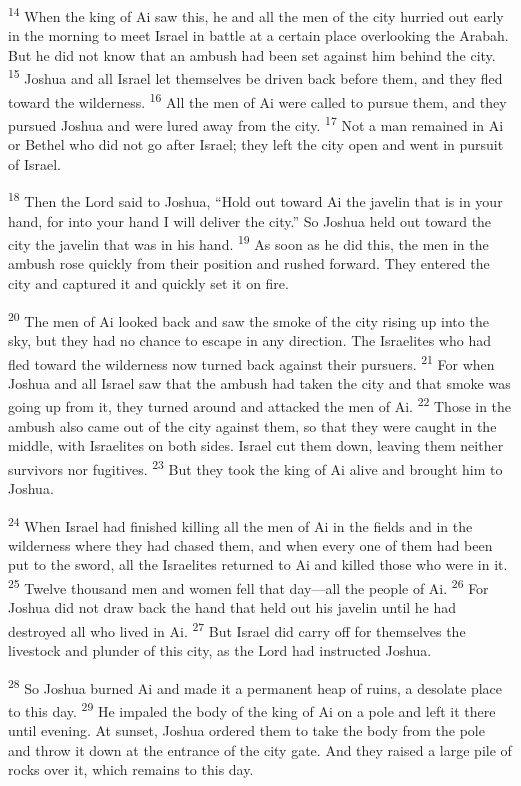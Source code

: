 \documentclass[12pt,twoside]{article}
\newcommand{\vs}[1]{\textsuperscript{#1}}
\begin{document}
\vs{14} When the king of Ai saw this, he and all the men of the city hurried out early in the morning to meet Israel in battle at a certain place overlooking the Arabah. But he did not know that an ambush had been set against him behind the city.
\vs{15} Joshua and all Israel let themselves be driven back before them, and they fled toward the wilderness.
\vs{16} All the men of Ai were called to pursue them, and they pursued Joshua and were lured away from the city.
\vs{17} Not a man remained in Ai or Bethel who did not go after Israel; they left the city open and went in pursuit of Israel.

\vs{18} Then the Lord said to Joshua, ``Hold out toward Ai the javelin that is in your hand, for into your hand I will deliver the city.'' So Joshua held out toward the city the javelin that was in his hand.
\vs{19} As soon as he did this, the men in the ambush rose quickly from their position and rushed forward. They entered the city and captured it and quickly set it on fire.

\vs{20} The men of Ai looked back and saw the smoke of the city rising up into the sky, but they had no chance to escape in any direction. The Israelites who had fled toward the wilderness now turned back against their pursuers.
\vs{21} For when Joshua and all Israel saw that the ambush had taken the city and that smoke was going up from it, they turned around and attacked the men of Ai.
\vs{22} Those in the ambush also came out of the city against them, so that they were caught in the middle, with Israelites on both sides. Israel cut them down, leaving them neither survivors nor fugitives.
\vs{23} But they took the king of Ai alive and brought him to Joshua.

\vs{24} When Israel had finished killing all the men of Ai in the fields and in the wilderness where they had chased them, and when every one of them had been put to the sword, all the Israelites returned to Ai and killed those who were in it.
\vs{25} Twelve thousand men and women fell that day---all the people of Ai.
\vs{26} For Joshua did not draw back the hand that held out his javelin until he had destroyed all who lived in Ai.
\vs{27} But Israel did carry off for themselves the livestock and plunder of this city, as the Lord had instructed Joshua.

\vs{28} So Joshua burned Ai and made it a permanent heap of ruins, a desolate place to this day.
\vs{29} He impaled the body of the king of Ai on a pole and left it there until evening. At sunset, Joshua ordered them to take the body from the pole and throw it down at the entrance of the city gate. And they raised a large pile of rocks over it, which remains to this day.
\end{document}
